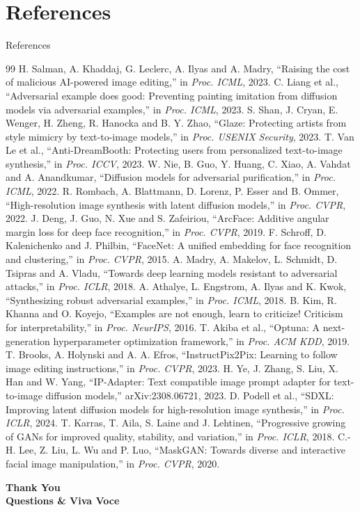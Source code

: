 \documentclass[aspectratio=169, 11pt]{beamer}
\begin{document}
\section{References}
\begin{frame}[allowframebreaks]{References}
    \fontsize{7.5pt}{8.6pt}\selectfont
    \begin{thebibliography}{99}
         H. Salman, A. Khaddaj, G. Leclerc, A. Ilyas and A. Madry, ``Raising the cost of malicious AI-powered image editing,'' in \emph{Proc. ICML}, 2023.
         C. Liang et al., ``Adversarial example does good: Preventing painting imitation from diffusion models via adversarial examples,'' in \emph{Proc. ICML}, 2023.
         S. Shan, J. Cryan, E. Wenger, H. Zheng, R. Hanocka and B. Y. Zhao, ``Glaze: Protecting artists from style mimicry by text-to-image models,'' in \emph{Proc. USENIX Security}, 2023.
         T. Van Le et al., ``Anti-DreamBooth: Protecting users from personalized text-to-image synthesis,'' in \emph{Proc. ICCV}, 2023.
         W. Nie, B. Guo, Y. Huang, C. Xiao, A. Vahdat and A. Anandkumar, ``Diffusion models for adversarial purification,'' in \emph{Proc. ICML}, 2022.
         R. Rombach, A. Blattmann, D. Lorenz, P. Esser and B. Ommer, ``High-resolution image synthesis with latent diffusion models,'' in \emph{Proc. CVPR}, 2022.
         J. Deng, J. Guo, N. Xue and S. Zafeiriou, ``ArcFace: Additive angular margin loss for deep face recognition,'' in \emph{Proc. CVPR}, 2019.
         F. Schroff, D. Kalenichenko and J. Philbin, ``FaceNet: A unified embedding for face recognition and clustering,'' in \emph{Proc. CVPR}, 2015.
         A. Madry, A. Makelov, L. Schmidt, D. Tsipras and A. Vladu, ``Towards deep learning models resistant to adversarial attacks,'' in \emph{Proc. ICLR}, 2018.
         A. Athalye, L. Engstrom, A. Ilyas and K. Kwok, ``Synthesizing robust adversarial examples,'' in \emph{Proc. ICML}, 2018.
         B. Kim, R. Khanna and O. Koyejo, ``Examples are not enough, learn to criticize! Criticism for interpretability,'' in \emph{Proc. NeurIPS}, 2016.
         T. Akiba et al., ``Optuna: A next-generation hyperparameter optimization framework,'' in \emph{Proc. ACM KDD}, 2019.
         T. Brooks, A. Holynski and A. A. Efros, ``InstructPix2Pix: Learning to follow image editing instructions,'' in \emph{Proc. CVPR}, 2023.
         H. Ye, J. Zhang, S. Liu, X. Han and W. Yang, ``IP-Adapter: Text compatible image prompt adapter for text-to-image diffusion models,'' arXiv:2308.06721, 2023.
         D. Podell et al., ``SDXL: Improving latent diffusion models for high-resolution image synthesis,'' in \emph{Proc. ICLR}, 2024.
         T. Karras, T. Aila, S. Laine and J. Lehtinen, ``Progressive growing of GANs for improved quality, stability, and variation,'' in \emph{Proc. ICLR}, 2018.
         C.-H. Lee, Z. Liu, L. Wu and P. Luo, ``MaskGAN: Towards diverse and interactive facial image manipulation,'' in \emph{Proc. CVPR}, 2020.
    \end{thebibliography}
\end{frame}

\begin{frame}
    \centering
    {\Huge \textbf{\textcolor{amritaMaroon}{Thank You}}} \\[0.4cm]
    {\large \textbf{Questions \& Viva Voce}}
\end{frame}
\end{document}
